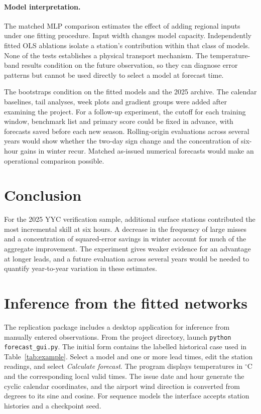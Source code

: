 \documentclass[11pt,letterpaper]{article}
\newcommand{\celsius}{\ensuremath{^{\circ}\mathrm{C}}}\newcommand{\code}[1]{\texttt{\small #1}}
\begin{document}
\paragraph{Model interpretation.}
The matched MLP comparison estimates the effect of adding regional inputs under one fitting procedure. Input width changes model capacity. Independently fitted OLS ablations isolate a station's contribution within that class of models. None of the tests establishes a physical transport mechanism. The temperature-band results condition on the future observation, so they can diagnose error patterns but cannot be used directly to select a model at forecast time.

The bootstraps condition on the fitted models and the 2025 archive. The calendar baselines, tail analyses, week plots and gradient groups were added after examining the project. For a follow-up experiment, the cutoff for each training window, benchmark list and primary score could be fixed in advance, with forecasts saved before each new season. Rolling-origin evaluations across several years would show whether the two-day sign change and the concentration of six-hour gains in winter recur. Matched as-issued numerical forecasts would make an operational comparison possible.


\section{Conclusion}
For the 2025 YYC verification sample, additional surface stations contributed the most incremental skill at six hours. A decrease in the frequency of large misses and a concentration of squared-error savings in winter account for much of the aggregate improvement. The experiment gives weaker evidence for an advantage at longer leads, and a future evaluation across several years would be needed to quantify year-to-year variation in these estimates.
\appendix


\section{Inference from the fitted networks}\label{inference}
The replication package includes a desktop application for inference from manually entered observations. From the project directory, launch \code{python forecast\_gui.py}. The initial form contains the labelled historical case used in Table~\ref{tab:example}. Select a model and one or more lead times, edit the station readings, and select \emph{Calculate forecast}. The program displays temperatures in \celsius{} and the corresponding local valid times. The issue date and hour generate the cyclic calendar coordinates, and the airport wind direction is converted from degrees to its sine and cosine. For sequence models the interface accepts station histories and a checkpoint seed.
\end{document}
